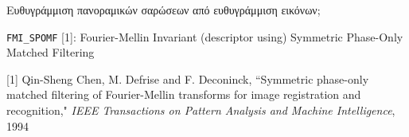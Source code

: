 \begin{frame}{Ευθυγράμμιση πανοραμικών σαρώσεων από ευθυγράμμιση εικόνων;}

  {\small
  \texttt{FMI\_SPOMF} [1]: Fourier-Mellin Invariant (descriptor using) Symmetric Phase-Only Matched Filtering
  }

  \begin{figure}
    
  \end{figure}

  \placebottom
  \tiny
  [1] Qin-Sheng Chen, M. Defrise and F. Deconinck, ``Symmetric phase-only matched filtering of Fourier-Mellin transforms for image registration and recognition," \textit{IEEE Transactions on Pattern Analysis and Machine Intelligence}, 1994




\end{frame}
